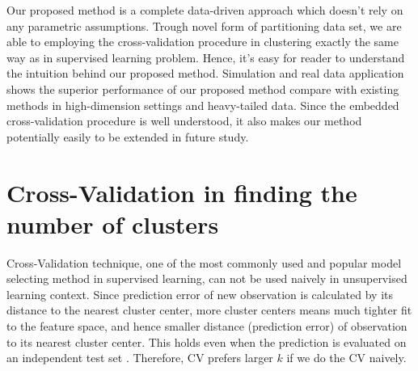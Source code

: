 \documentclass[11pt]{article}
\begin{document}
Our proposed method is a complete data-driven approach which doesn't rely on any parametric assumptions. Trough novel form of partitioning data set, we are able to employing the cross-validation procedure in clustering exactly the same way as in supervised learning problem. Hence, it's easy for reader to understand the intuition behind our proposed method. Simulation and real data application shows the superior performance of our proposed method compare with existing methods in high-dimension settings and heavy-tailed data. Since the embedded cross-validation procedure is well understood, it also makes our method potentially easily to be extended in future study. 
 
\section{Cross-Validation in finding the number of clusters}
Cross-Validation technique, one of the most commonly used and popular model selecting method in supervised learning, can not be used naively in unsupervised learning context. Since prediction error of new observation is calculated by its distance to the nearest cluster center, more cluster centers means much tighter fit to the feature space, and hence smaller distance (prediction error) of observation to its nearest cluster center. This holds even when the prediction is evaluated on an independent test set \citep{hastie2009elements}. Therefore, CV prefers larger $k$ if we do the CV naively.\\
\end{document}
